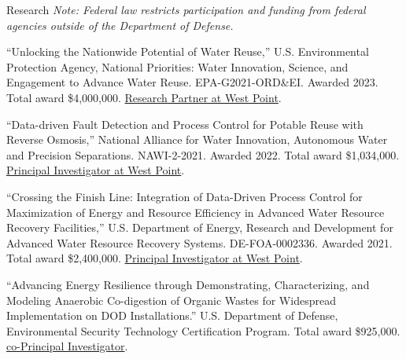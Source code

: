 \documentclass{resume} %
\begin{document}
\begin{rSection}{Research}
\emph{Note: Federal law restricts participation and funding from federal agencies outside of the Department of Defense.}

``Unlocking the Nationwide Potential of Water Reuse,'' U.S. Environmental Protection Agency, National Priorities: Water Innovation, Science, and Engagement to Advance Water Reuse. EPA-G2021-ORD\&EI. Awarded 2023. Total award \$4,000,000. \ul{Research Partner at West Point}.

``Data-driven Fault Detection and Process Control for Potable Reuse with Reverse Osmosis,'' National Alliance for Water Innovation, Autonomous Water and Precision Separations. NAWI-2-2021. Awarded 2022. Total award \$1,034,000. \ul{Principal Investigator at West Point}.

``Crossing the Finish Line: Integration of Data-Driven Process Control for Maximization of Energy and Resource Efficiency in Advanced Water Resource Recovery Facilities,'' U.S. Department of Energy, Research and Development for Advanced Water Resource Recovery Systems. DE-FOA-0002336. Awarded 2021. Total award \$2,400,000. \ul{Principal Investigator at West Point}.

``Advancing Energy Resilience through Demonstrating, Characterizing, and Modeling Anaerobic Co-digestion of Organic Wastes for Widespread Implementation on DOD Installations.''  U.S. Department of Defense, Environmental Security Technology Certification Program. Total award \$925,000. \ul{co-Principal Investigator}.

\end{rSection}



\end{document}

